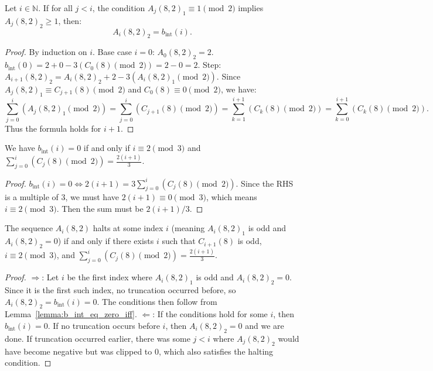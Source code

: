 \begin{lemma}
  \label{lemma:Aiter_snd_eq_b_int}
  \leanok
  Let $i \in \mathbb{N}$. If for all $j < i$, the condition $A_j(8, 2)_1 \equiv 1 \pmod 2$ implies $A_j(8, 2)_2 \geq 1$, then:
  \[ A_i(8, 2)_2 = b_{\text{int}}(i). \]
  \begin{proof}
    \leanok
    By induction on $i$. Base case $i=0$: $A_0(8, 2)_2 = 2$. $b_{\text{int}}(0) = 2 + 0 - 3(C_0(8) \pmod 2) = 2 - 0 = 2$.
    Step: $A_{i+1}(8, 2)_2 = A_i(8, 2)_2 + 2 - 3(A_i(8, 2)_1 \pmod 2)$.
    Since $A_j(8, 2)_1 \equiv C_{j+1}(8) \pmod 2$ and $C_0(8) \equiv 0 \pmod 2$, we have:
    \[ \sum_{j=0}^{i} (A_j(8, 2)_1 \pmod 2) = \sum_{j=0}^{i} (C_{j+1}(8) \pmod 2) = \sum_{k=1}^{i+1} (C_k(8) \pmod 2) = \sum_{k=0}^{i+1} (C_k(8) \pmod 2). \]
    Thus the formula holds for $i+1$.
  \end{proof}
\end{lemma}

\begin{lemma}
  \label{lemma:b_int_eq_zero_iff}
  \leanok
  We have $b_{\text{int}}(i) = 0$ if and only if $i \equiv 2 \pmod 3$ and $\sum_{j=0}^i (C_j(8) \pmod 2) = \frac{2(i+1)}{3}$.
  \begin{proof}
    \leanok
    $b_{\text{int}}(i) = 0 \iff 2(i+1) = 3 \sum_{j=0}^i (C_j(8) \pmod 2)$.
    Since the RHS is a multiple of 3, we must have $2(i+1) \equiv 0 \pmod 3$, which means $i \equiv 2 \pmod 3$.
    Then the sum must be $2(i+1)/3$.
  \end{proof}
\end{lemma}

\begin{theorem}
  \label{thm:Aiter_8_2_halt_iff_Citer_8_halt}
  \leanok
  The sequence $A_i(8, 2)$ halts at some index $i$ (meaning $A_i(8, 2)_1$ is odd and $A_i(8, 2)_2 = 0$) if and only if there exists $i$ such that $C_{i+1}(8)$ is odd, $i \equiv 2 \pmod 3$, and $\sum_{j=0}^i (C_j(8) \pmod 2) = \frac{2(i+1)}{3}$.
  \begin{proof}
    \leanok
    $\Rightarrow$: Let $i$ be the first index where $A_i(8, 2)_1$ is odd and $A_i(8, 2)_2 = 0$. Since it is the first such index, no truncation occurred before, so $A_i(8, 2)_2 = b_{\text{int}}(i) = 0$. The conditions then follow from Lemma~\ref{lemma:b_int_eq_zero_iff}.
    $\Leftarrow$: If the conditions hold for some $i$, then $b_{\text{int}}(i) = 0$. If no truncation occurs before $i$, then $A_i(8, 2)_2 = 0$ and we are done. If truncation occurred earlier, there was some $j < i$ where $A_j(8, 2)_2$ would have become negative but was clipped to 0, which also satisfies the halting condition.
  \end{proof}
\end{theorem}

